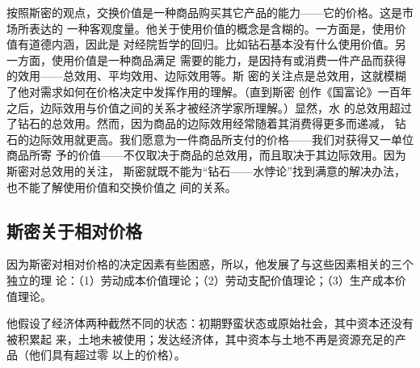 按照斯密的观点，交换价值是一种商品购买其它产品的能力——它的价格。这是市场所表达的
一种客观度量。他关于使用价值的概念是含糊的。一方面是，使用价值有道德内涵，因此是
对经院哲学的回归。比如钻石基本没有什么使用价值。另一方面，使用价值是一种商品满足
需要的能力，是因持有或消费一件产品而获得的效用——总效用、平均效用、边际效用等。斯
密的关注点是总效用，这就模糊了他对需求如何在价格决定中发挥作用的理解。（直到斯密
创作《国富论》一百年之后，边际效用与价值之间的关系才被经济学家所理解。）显然，水
的总效用超过了钻石的总效用。然而，因为商品的边际效用经常随着其消费得更多而递减，
钻石的边际效用就更高。我们愿意为一件商品所支付的价格——我们对获得又一单位商品所寄
予的价值——不仅取决于商品的总效用，而且取决于其边际效用。因为斯密对总效用的关注，
斯密就既不能为“钻石——水悖论”找到满意的解决办法，也不能了解使用价值和交换价值之
间的关系。

\subsection{斯密关于相对价格}

因为斯密对相对价格的决定因素有些困惑，所以，他发展了与这些因素相关的三个独立的理
论：（1）劳动成本价值理论；（2）劳动支配价值理论；（3）生产成本价值理论。

他假设了经济体两种截然不同的状态：初期野蛮状态或原始社会，其中资本还没有被积累起
来，土地未被使用；发达经济体，其中资本与土地不再是资源充足的产品（他们具有超过零
以上的价格）。

